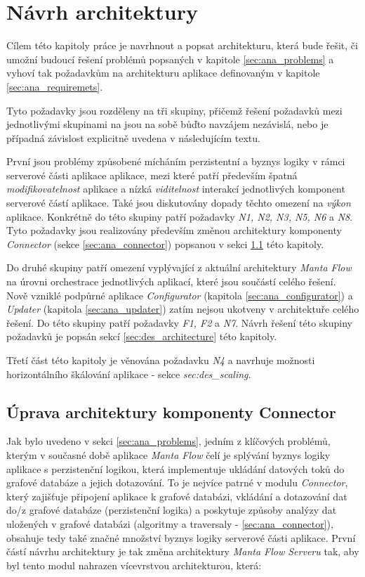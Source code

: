\chapter{Návrh architektury}
Cílem této kapitoly práce je navrhnout a popsat architekturu, která bude řešit, či umožní budoucí řešení problémů popsaných v kapitole \ref{sec:ana_problems} a vyhoví tak požadavkům na architekturu aplikace definovaným v kapitole \ref{sec:ana_requiremets}.

Tyto požadavky jsou rozděleny na tři skupiny, přičemž řešení požadavků mezi jednotlivými skupinami na jsou na sobě bůďto navzájem nezávislá, nebo je případná závislost explicitně uvedena v následujícím textu.

První jsou problémy způsobené mícháním perzistentní a byznys logiky v rámci serverové části aplikace aplikace, mezi které patří především špatná \textit{modifikovatelnost} aplikace a nízká \textit{viditelnost} interakcí jednotlivých komponent serverové částí aplikace. Také jsou diskutovány dopady těchto omezení na \textit{výkon} aplikace. Konkrétně do této skupiny patří požadavky \textit{N1, N2, N3, N5, N6} a \textit{N8}. Tyto požadavky jsou realizovány především změnou architektury komponenty \textit{Connector} (sekce \ref{sec:ana_connector}) popsanou v sekci \ref{sec:des_api} této kapitoly.

Do druhé skupiny patří omezení vyplývající z aktuální architektury \textit{Manta Flow} na úrovni orchestrace jednotlivých aplikací, které jsou součástí celého řešení. Nově vzniklé podpůrné aplikace \textit{Configurator} (kapitola \ref{sec:ana_configurator}) a \textit{Updater} (kapitola \ref{sec:ana_updater}) zatím nejsou ukotveny v architektuře celého řešení. Do této skupiny patří požadavky \textit{F1, F2} a \textit{N7}. Návrh řešení této skupiny požadavků je popsán sekcí \ref{sec:des_architecture} této kapitoly.

Třetí část této kapitoly je věnována požadavku \textit{N4} a navrhuje možnosti horizontálního škálování aplikace - sekce \textit{sec:des_scaling}.

\section{Úprava architektury komponenty Connector}
\label{sec:des_api}
Jak bylo uvedeno v sekci \ref{sec:ana_problems}, jedním z klíčových problémů, kterým v současné době aplikace \textit{Manta Flow} čelí je splývání byznys logiky aplikace s perzistenční logikou, která implementuje ukládání datových toků do grafové databáze a jejich dotazování. To je nejvíce patrné v modulu \textit{Connector}, který zajišťuje připojení aplikace k grafové databázi, vkládání a dotazování dat do/z grafové databáze (perzistenční logika) a poskytuje způsoby analýzy dat uložených v grafové databázi (algoritmy a traversaly - \ref{sec:ana_connector}), obsahuje tedy také značné množství byznys logiky serverové části aplikace. První částí návrhu architektury je tak změna architektury \textit{Manta Flow Serveru} tak, aby byl tento modul nahrazen vícevrstvou architekturou, která:

